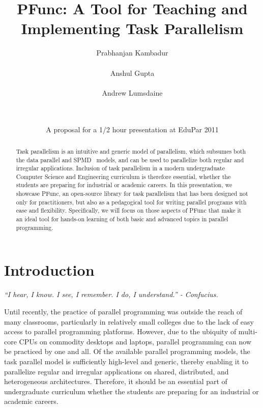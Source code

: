 \documentclass[9pt,twocolumn,letter]{article}
\begin{document}
\title{PFunc: A Tool for Teaching and Implementing Task Parallelism}

\date{A proposal for a 1/2 hour presentation at EduPar 2011}

\author{
  \alignauthor Prabhanjan Kambadur\\
  \\
  \alignauthor Anshul Gupta\\
  \\
  \alignauthor Andrew Lumsdaine\\
  \\
  \\
}

\maketitle

\begin{abstract} 
Task parallelism is an intuitive and generic model of parallelism, which
subsumes both the data parallel and SPMD~\cite{darema2001} models, and can be
used to parallelize both regular and irregular applications.
%
Inclusion of task parallelism in a modern undergraduate Computer Science and
Engineering curriculum is therefore essential, whether the students are
preparing for industrial or academic careers.
%
In this presentation, we showcase PFunc, an open-source library for
task parallelism that has been designed not only for practitioners, 
but also as
a pedagogical tool for writing parallel programs with ease and flexibility.
%
Specifically, we will focus on those aspects of PFunc that make it an ideal 
tool for hands-on
learning of both basic and advanced topics in parallel programming.
\end{abstract}

\section{Introduction}
\begin{center}
\small{\textit{``I hear, I know. I see, I remember. I do, I understand.'' -
Confucius.}}
\end{center}
%
Until recently, the practice of parallel programming was outside the reach of
many classrooms, particularly in relatively small colleges due to the lack of
easy access to parallel programming platforms.
% 
However, due to the ubiquity of multi-core CPUs on commodity desktops and
laptops, parallel programming can now be practiced by one and all.
Of the available parallel programming models, the task parallel model is 
sufficiently high-level and generic, thereby enabling it to parallelize regular
and irregular applications on shared, distributed, and heterogeneous
architectures.  
%
Therefore, it should be an essential part of undergraduate curriculum whether
the students are preparing for an industrial or academic careers.
\end{document}
